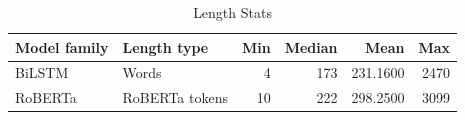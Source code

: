 \begin{table}
\caption{Length Stats}
\label{tab:length_stats}
\begin{tabular}{llrrrr}
\toprule
Model family & Length type & Min & Median & Mean & Max \\
\midrule
BiLSTM & Words & 4 & 173 & 231.1600 & 2470 \\
RoBERTa & RoBERTa tokens & 10 & 222 & 298.2500 & 3099 \\
\bottomrule
\end{tabular}
\end{table}
